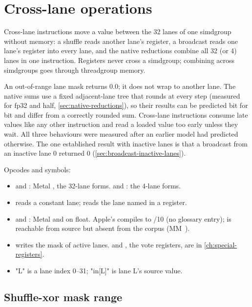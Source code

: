 \chapter{Cross-lane operations}\label{ch:cross-lane-operations}

Cross-lane instructions move a value between the 32 lanes of one simdgroup without memory: a shuffle
reads another lane's register, a broadcast reads one lane's register into every lane, and the native reductions combine all
32 (or 4) lanes in one instruction. Registers never cross a simdgroup; combining across simdgroups goes through
threadgroup memory.

An out-of-range lane mask returns 0.0; it does not wrap to another lane. The native sums use a fixed adjacent-lane tree
that rounds at every step (measured for fp32 and half, \cref{sec:native-reductions}), so their results can be predicted bit for bit and differ
from a correctly rounded sum. Cross-lane instructions consume late values like any other instruction and read a loaded
value too early unless they wait. All three behaviours were measured after an earlier model had predicted otherwise. The one
established result with inactive lanes is that a broadcast from an inactive lane 0 returned 0 (\cref{sec:broadcast-inactive-lanes}).

Opcodes and symbols:

\begin{itemize}
\item {} and : Metal , the
  32-lane forms.  and : the 4-lane forms.
\item {} reads a constant lane;  reads the
  lane named in a register.
\item {} and : Metal  and  on float. Apple's 
  compiles to /10 (no glossary entry);  is reachable from source but absent from the
  corpus (MM~).
\item {} writes the mask of active lanes.  and , the vote registers, are
  in \cref{ch:special-registers}.
\item "L" is a lane index 0–31; "in{[}L{]}" is lane L's source value.
\end{itemize}

\section{Shuffle-xor mask range}\label{sec:shuffle-xor-bounded-masks}

